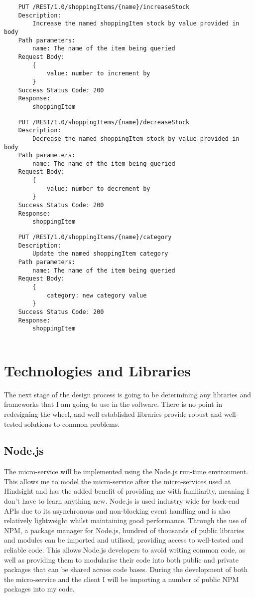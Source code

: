 \begin{verbatim}
    PUT /REST/1.0/shoppingItems/{name}/increaseStock
    Description:
        Increase the named shoppingItem stock by value provided in body
    Path parameters:
        name: The name of the item being queried
    Request Body:
        {
            value: number to increment by
        }
    Success Status Code: 200
    Response:
        shoppingItem
\end{verbatim}\medskip

\begin{verbatim}
    PUT /REST/1.0/shoppingItems/{name}/decreaseStock
    Description:
        Decrease the named shoppingItem stock by value provided in body
    Path parameters:
        name: The name of the item being queried
    Request Body:
        {
            value: number to decrement by
        }
    Success Status Code: 200
    Response:
        shoppingItem
\end{verbatim}\medskip


\begin{verbatim}
    PUT /REST/1.0/shoppingItems/{name}/category
    Description:
        Update the named shoppingItem category
    Path parameters:
        name: The name of the item being queried
    Request Body:
        {
            category: new category value
        }
    Success Status Code: 200
    Response:
        shoppingItem
        
\end{verbatim}\medskip

\section{Technologies and Libraries}

The next stage of the design process is going to be determining any libraries and frameworks that I am going to use in the software. There is no point in redesigning the wheel, and well established libraries provide robust and well-tested solutions to common problems.

\subsection{Node.js}
The micro-service will be implemented using the Node.js run-time environment. This allows me to model the micro-service after the micro-services used at Hindsight and has the added benefit of providing me with familiarity, meaning I don't have to learn anything new. Node.js is used industry wide for back-end APIs due to its asynchronous and non-blocking event handling and is also relatively lightweight whilst maintaining good performance. Through the use of NPM, a package manager for Node.js, hundred of thousands of public libraries and modules can be imported and utilised, providing access to well-tested and reliable code. This allows Node.js developers to avoid writing common code, as well as providing them to modularise their code into both public and private packages that can be shared across code bases. During the development of both the micro-service and the client I will be importing a number of public NPM packages into my code.

